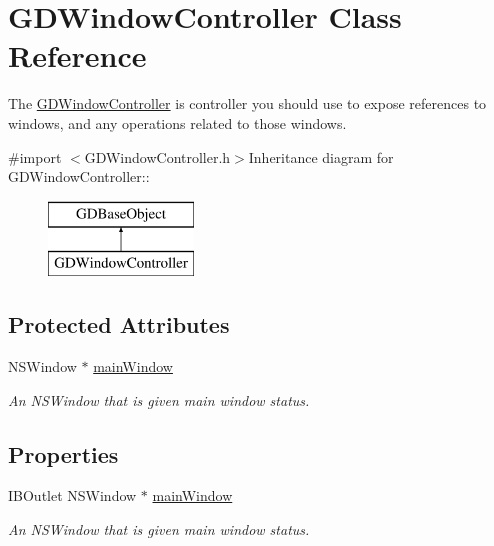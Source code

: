 \hypertarget{interface_g_d_window_controller}{
\section{GDWindowController Class Reference}
\label{interface_g_d_window_controller}
}


The \hyperlink{interface_g_d_window_controller}{GDWindowController} is controller you should use to expose references to windows, and any operations related to those windows.  


{\ttfamily \#import $<$GDWindowController.h$>$}Inheritance diagram for GDWindowController::\begin{figure}[H]
\begin{center}
\leavevmode
\includegraphics[height=2cm]{interface_g_d_window_controller}
\end{center}
\end{figure}
\subsection*{Protected Attributes}
\begin{DoxyCompactItemize}
\item 
NSWindow $\ast$ \hyperlink{interface_g_d_window_controller_ad60a5c503821413bf4cf05e2bfa6a313}{mainWindow}
\begin{DoxyCompactList}\small\item\em An NSWindow that is given main window status. \item\end{DoxyCompactList}\end{DoxyCompactItemize}
\subsection*{Properties}
\begin{DoxyCompactItemize}
\item 
IBOutlet NSWindow $\ast$ \hyperlink{interface_g_d_window_controller_a0c459acf28211fd35be4d3b2ddbc968a}{mainWindow}
\begin{DoxyCompactList}\small\item\em An NSWindow that is given main window status. \item\end{DoxyCompactList}\end{DoxyCompactItemize}


